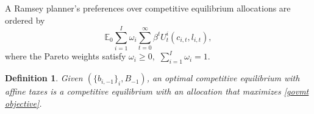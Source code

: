 \documentclass[thmsb,11pt]{article}
\newtheorem{definition}{Definition}
\begin{document}
A Ramsey planner's preferences over  competitive equilibrium allocations are ordered by
\begin{equation}
\mathbb{E}_{0}\sum_{i=1}^{I}\omega_{i}\sum_{t=0}^{\infty}\beta^{t}U_{t}^{i}\left(c_{i,t},l_{i,t}\right),\label{govmt objective}
\end{equation}
where the Pareto weights satisfy $\omega_{i}\geq0,$ $\sum_{i=1}^{I}\omega_{i}=1$.


\begin{definition}
\label{Def: optimal CE affine} Given $(\{b_{i,-1}\}_{i},B_{-1})$, an optimal
competitive equilibrium with affine taxes is a competitive equilibrium with an allocation that maximizes \eqref{govmt objective}.
\end{definition}
%
%
%
%
\end{document}
